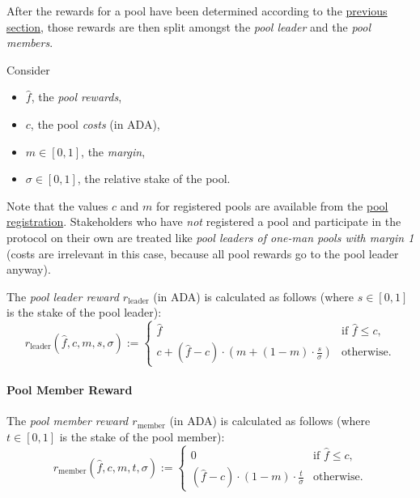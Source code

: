 \documentclass[11pt,a4paper]{article}
\begin{document}
After the rewards for a pool have been determined according to the
\hyperref[pool-rewards]{previous section}, those rewards are then split
amongst the \emph{pool leader} and the \emph{pool members}.

Consider

\begin{itemize}
\item
  \(\hat{f}\), the \emph{pool rewards},
\item
  \(c\), the pool \emph{costs} (in ADA),
\item
  \(m\in[0,1]\), the \emph{margin},
\item
  \(\sigma\in[0,1]\), the relative stake of the pool.
\end{itemize}

Note that the values \(c\) and \(m\) for registered pools are available
from the \hyperref[stake-pool-registration]{pool registration}.
Stakeholders who have \emph{not} registered a pool and participate in
the protocol on their own are treated like \emph{pool leaders of one-man
pools with margin 1} (costs are irrelevant in this case, because all
pool rewards go to the pool leader anyway).


The \emph{pool leader reward \(r_\mathrm{leader}\)} (in ADA) is
calculated as follows (where \(s\in[0,1]\) is the stake of the pool
leader): \[
    r_\mathrm{leader}(\hat{f}, c, m, s, \sigma) :=
    \left\{
    \begin{array}{ll}
        \displaystyle\hat{f} &
        \text{if $\hat{f}\leq c$,} \\
        \displaystyle c + (\hat{f} - c)\cdot\left(m + (1-m)\cdot\frac{s}{\sigma}\right) &
        \text{otherwise.}
    \end{array}
    \right.
\]

\paragraph{Pool Member Reward}\label{pool-member-reward}

The \emph{pool member reward \(r_\mathrm{member}\)} (in ADA) is
calculated as follows (where \(t\in[0,1]\) is the stake of the pool
member): \[
    r_\mathrm{member}(\hat{f}, c, m, t, \sigma) :=
    \left\{
    \begin{array}{ll}
        \displaystyle 0 &
        \text{if $\hat{f}\leq c$,} \\
        \displaystyle (\hat{f} - c)\cdot(1-m)\cdot\frac{t}{\sigma} &
        \text{otherwise.}
    \end{array}
    \right.
\]
\end{document}

